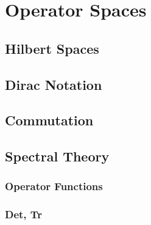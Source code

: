\chapter{Operator Spaces}\label{ch:hilbert}
\section{Hilbert Spaces}
\section{Dirac Notation}
\section{Commutation}
\section{Spectral Theory}
\subsection{Operator Functions}
\subsection{Det, Tr}

